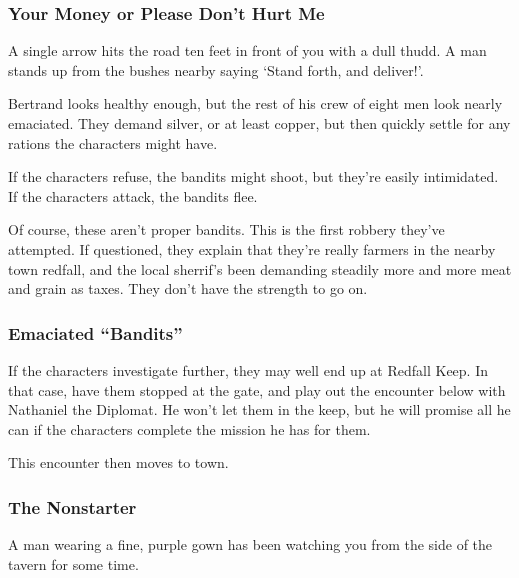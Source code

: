 \subsubsection{Your Money or Please Don't Hurt Me}

\begin{boxtext}
A single arrow hits the road ten feet in front of you with a dull thudd.  A man stands up from the bushes nearby saying `Stand forth, and deliver!'.
\end{boxtext}

Bertrand looks healthy enough, but the rest of his crew of eight men look nearly emaciated.  They demand silver, or at least copper, but then quickly settle for any rations the characters might have.

If the characters refuse, the bandits might shoot, but they're easily intimidated.  If the characters attack, the bandits flee.

Of course, these aren't proper bandits.  This is the first robbery they've attempted.  If questioned, they explain that they're really farmers in the nearby town \gls{redfall}, and the local sherrif's been demanding steadily more and more meat and grain as taxes.  They don't have the strength to go on.

\humansoldier

\subsubsection{Emaciated ``Bandits''}

If the characters investigate further, they may well end up at Redfall Keep.  In that case, have them stopped at the gate, and play out the encounter below with Nathaniel the Diplomat.  He won't let them in the keep, but he will promise all he can if the characters complete the mission he has for them.

This encounter then moves to town.

\subsubsection{The Nonstarter}

\begin{boxtext}
	A man wearing a fine, purple gown has been watching you from the side of the tavern for some time.
\end{boxtext}


